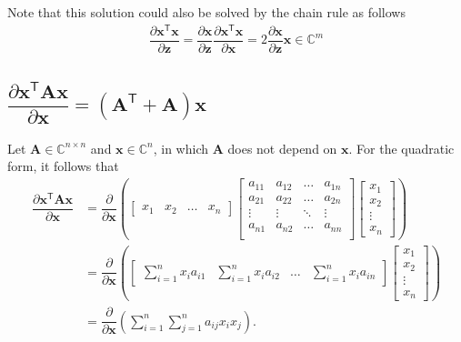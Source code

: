 \documentclass{article}
\newcommand{\trans}{\mathsf{T}}
\begin{document}
Note that this solution could also be solved by the chain rule as follows
\begin{align}
    \boxed{\dfrac{\partial \mathbf{x}^\trans \mathbf{x}}{\partial \mathbf{z}} = \dfrac{\partial \mathbf{x}}{\partial \mathbf{z}} \dfrac{\partial \mathbf{x}^\trans \mathbf{x}}{\partial \mathbf{x}} = 2\dfrac{\partial \mathbf{x}}{\partial \mathbf{z}}\mathbf{x} \in \mathbb{C}^m}
\end{align}

\subsection{\(\dfrac{\partial \mathbf{x}^\trans \mathbf{A} \mathbf{x}}{\partial \mathbf{x}} = \left(\mathbf{A}^\trans + \mathbf{A}\right) \mathbf{x}\)}
Let \(\mathbf{A}\in \mathbb{C}^{n\times n}\) and \(\mathbf{x} \in \mathbb{C}^{n}\), in which \(\mathbf{A}\) does not depend on \(\mathbf{x}\). For the quadratic form, it follows that
\begin{align}
    \dfrac{\partial \mathbf{x}^\trans \mathbf{A} \mathbf{x}}{\partial \mathbf{x}} &= \dfrac{\partial}{\partial \mathbf{x}} \left(
    \begin{bmatrix}
        x_{1} & x_{2} & \dots & x_{n}
    \end{bmatrix}
    \begin{bmatrix}
        a_{11} & a_{12} & \dots & a_{1n} \\
        a_{21} & a_{22} & \dots & a_{2n} \\
        \vdots & \vdots & \ddots & \vdots \\
        a_{n1} & a_{n2} & \dots & a_{nn} \\
    \end{bmatrix} \begin{bmatrix}
        x_{1} \\ x_{2} \\ \vdots \\ x_{n}
    \end{bmatrix} \right) \\
    &= \dfrac{\partial}{\partial \mathbf{x}} \left(
			\begin{bmatrix}
				\displaystyle \sum_{i = 1}^{n} x_{i}a_{i1} & 
				\displaystyle \sum_{i = 1}^{n} x_{i}a_{i2} & 
				\dots & 
				\displaystyle \sum_{i = 1}^{n} x_{i}a_{in}
			\end{bmatrix} \begin{bmatrix}
				x_{1} \\ x_{2} \\ \vdots \\ x_{n}
			\end{bmatrix} \right) \\
            &= \dfrac{\partial}{\partial \mathbf{x}} \left(
				\sum_{i = 1}^{n}\sum_{j = 1}^{n} a_{ij} x_{i} x_{j}
			\right).
\end{align}
\end{document}
